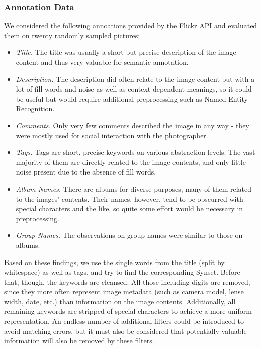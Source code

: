 \subsubsection{Annotation Data}
\label{sec_annotationdata}
We considered the following annoations provided by the Flickr API and evaluated them on twenty randomly sampled pictures: 
\begin{itemize} 
\item{\emph{Title.}} The title was usually a short but precise description of the image content and thus very valuable for semantic annotation.
\item{\emph{Description.}} The description did often relate to the image content but with a lot of fill words and noise as well as context-dependent meanings, so it could be useful but would require additional preprocessing such as Named Entity Recognition.
\item{\emph{Comments.}} Only very few comments described the image in any way - they were mostly used for social interaction with the photographer. 
\item{\emph{Tags.}} Tags are short, precise keywords on various abstraction levels. The vast majority of them are directly related to the image contents, and only little noise present due to the absence of fill words.
\item{\emph{Album Names.}} There are albums for diverse purposes, many of them related to the images' contents. Their names, however, tend to be obscurred with special characters and the like, so quite some effort would be necessary in preprocessing.
\item{\emph{Group Names.}} The observations on group names were similar to those on albums.
\end{itemize}

Based on these findings, we use the single words from the title (split by whitespace) as well as tags, and try to find the corresponding Synset. Before that, though, the keywords are cleansed: All those including digits are removed, since they more often represent image metadata (such as camera model, lense width, date, etc.) than information on the image contents. Additionally, all remaining keywords are stripped of special characters to achieve a more uniform representation. An endless number of additional filters could be introduced to avoid matching errors, but it must also be considered that potentially valuable information will also be removed by these filters.  \\

